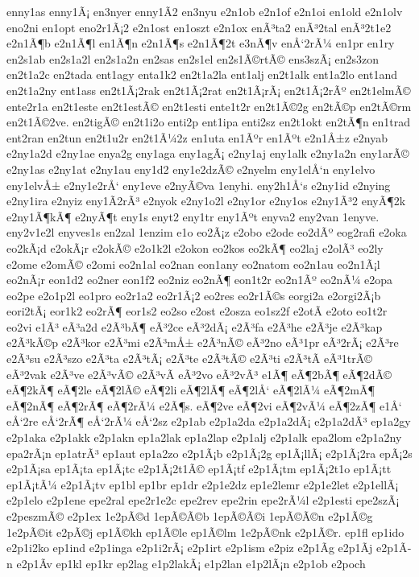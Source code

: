 {enny1as
enny1Ã¡
en3nyer
enny1Ã­2
en3nyu
e2n1ob
e2n1of
e2n1oi
en1old
e2n1olv
eno2ni
en1opt
eno2r1Ã¡2
e2n1ost
en1oszt
e2n1ox
enÃ³ta2
enÃ³2tal
enÃ³2t1e2
e2n1Ã¶b
e2n1Ã¶l
en1Ã¶n
e2n1Ã¶s
e2n1Ã¶2t
e3nÃ¶v
enÅ‘2rÃ¼
en1pr
en1ry
en2s1ab
en2s1a2l
en2s1a2n
en2sas
en2s1el
en2s1Ã©rtÃ©
ens3szÃ¡
en2s3zon
en2t1a2c
en2tada
ent1agy
enta1k2
en2t1a2la
ent1alj
en2t1alk
ent1a2lo
ent1and
en2t1a2ny
ent1ass
en2t1Ã¡2rak
en2t1Ã¡2rat
en2t1Ã¡rÃ¡
en2t1Ã¡2rÃº
en2t1elmÃ©
ente2r1a
en2t1este
en2t1estÃ©
en2t1esti
ente1t2r
en2t1Ã©2g
en2tÃ©p
en2tÃ©rm
en2t1Ã©2ve.
en2tigÃ©
en2t1i2o
enti2p
ent1ipa
enti2sz
en2t1okt
en2tÃ¶n
en1trad
ent2ran
en2tun
en2t1u2r
en2t1Ã¼2z
en1uta
en1Ãºr
en1Ãºt
e2n1Å±z
e2nyab
e2ny1a2d
e2ny1ae
enya2g
eny1aga
eny1agÃ¡
e2ny1aj
eny1alk
e2ny1a2n
eny1arÃ©
e2ny1as
e2ny1at
e2ny1au
eny1d2
eny1e2dzÃ©
e2nyelm
eny1elÅ‘n
eny1elvo
eny1elvÅ±
e2ny1e2rÅ‘
eny1eve
e2nyÃ©va
1enyhi.
eny2h1Å‘s
e2ny1id
e2nying
e2ny1ira
e2nyiz
eny1Ã­2rÃ³
e2nyok
e2ny1o2l
e2ny1or
e2ny1os
e2ny1Ã³2
enyÃ¶2k
e2ny1Ã¶kÃ¶
e2nyÃ¶t
eny1s
enyt2
eny1tr
eny1Ãºt
enyva2
eny2van
1enyve.
eny2v1e2l
enyves1s
en2zal
1enzim
e1o
eo2Ã¡z
e2obo
e2ode
eo2dÃº
eog2rafi
e2oka
eo2kÃ¡d
e2okÃ¡r
e2okÃ©
e2o1k2l
e2okon
eo2kos
eo2kÃ¶
eo2laj
e2olÃ³
eo2ly
e2ome
e2omÃ©
e2omi
eo2n1al
eo2nan
eon1any
eo2natom
eo2n1au
eo2n1Ã¡l
eo2nÃ¡r
eon1d2
eo2ner
eon1f2
eo2niz
eo2nÃ¶
eon1t2r
eo2n1Ãº
eo2nÃ¼
e2opa
eo2pe
e2o1p2l
eo1pro
eo2r1a2
eo2r1Ã¡2
eo2res
eo2r1Ã©s
eorgi2a
e2orgi2Ã¡b
eori2tÃ¡
eor1k2
eo2rÃ¶
eor1s2
eo2so
e2ost
e2osza
eo1sz2f
e2otÃ­
e2oto
eo1t2r
eo2vi
e1Ã³
eÃ³a2d
e2Ã³bÃ¶
eÃ³2ce
eÃ³2dÃ¡
e2Ã³fa
e2Ã³he
e2Ã³je
e2Ã³kap
e2Ã³kÃ©p
e2Ã³kor
e2Ã³mi
e2Ã³mÅ±
e2Ã³nÃ©
eÃ³2no
eÃ³1pr
eÃ³2rÃ¡
e2Ã³re
e2Ã³su
e2Ã³szo
e2Ã³ta
e2Ã³tÃ¡
e2Ã³te
e2Ã³tÃ©
e2Ã³ti
e2Ã³tÃ­
eÃ³1trÃ©
eÃ³2vak
e2Ã³ve
e2Ã³vÃ©
e2Ã³vÃ­
eÃ³2vo
eÃ³2vÃ³
e1Ã¶
eÃ¶2bÃ¶
eÃ¶2dÃ©
eÃ¶2kÃ¶
eÃ¶2le
eÃ¶2lÃ©
eÃ¶2li
eÃ¶2lÃ¶
eÃ¶2lÅ‘
eÃ¶2lÃ¼
eÃ¶2mÃ¶
eÃ¶2nÃ¶
eÃ¶2rÃ¶
eÃ¶2rÃ¼
e2Ã¶s.
eÃ¶2ve
eÃ¶2vi
eÃ¶2vÃ¼
eÃ¶2zÃ¶
e1Å‘
eÅ‘2re
eÅ‘2rÃ¶
eÅ‘2rÃ¼
eÅ‘2sz
e2p1ab
e2p1a2da
e2p1a2dÃ¡
e2p1a2dÃ³
ep1a2gy
e2p1aka
e2p1akk
e2p1akn
ep1a2lak
ep1a2lap
e2p1alj
e2p1alk
epa2lom
e2p1a2ny
epa2rÃ¡n
ep1atrÃ³
ep1aut
ep1a2zo
e2p1Ã¡b
e2p1Ã¡2g
ep1Ã¡llÃ¡
e2p1Ã¡2ra
epÃ¡2s
e2p1Ã¡sa
ep1Ã¡ta
ep1Ã¡tc
e2p1Ã¡2t1Ã©
ep1Ã¡tf
e2p1Ã¡tm
ep1Ã¡2t1o
ep1Ã¡tt
ep1Ã¡tÃ¼
e2p1Ã¡tv
ep1bl
ep1br
ep1dr
e2p1e2dz
ep1e2lemr
e2p1e2let
e2p1ellÃ¡
e2p1elo
e2p1ene
epe2ral
epe2r1e2c
epe2rev
epe2rin
epe2rÃ¼l
e2p1esti
epe2szÃ¡
e2peszmÃ©
e2p1ex
1e2pÃ©d
1epÃ©Ã©b
1epÃ©Ã©i
1epÃ©Ã©n
e2p1Ã©g
1e2pÃ©it
e2pÃ©j
ep1Ã©kh
ep1Ã©le
ep1Ã©lm
1e2pÃ©nk
e2p1Ã©r.
ep1fl
ep1ido
e2p1i2ko
ep1ind
e2p1inga
e2p1i2rÃ¡
e2p1irt
e2p1ism
e2piz
e2p1Ã­g
e2p1Ã­j
e2p1Ã­n
e2p1Ã­v
ep1kl
ep1kr
ep2lag
e1p2lakÃ¡
e1p2lan
e1p2lÃ¡n
e2p1ob
e2poch
}

